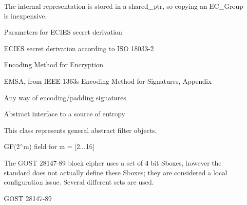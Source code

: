 The internal representation is stored in a shared\+\_\+ptr, so copying an E\+C\+\_\+\+Group is inexpensive.

Parameters for E\+C\+I\+ES secret derivation

E\+C\+I\+ES secret derivation according to I\+SO 18033-\/2

Encoding Method for Encryption

E\+M\+SA, from I\+E\+EE 1363s Encoding Method for Signatures, Appendix

Any way of encoding/padding signatures

Abstract interface to a source of entropy

This class represents general abstract filter objects.

G\+F(2$^\wedge$m) field for m = \mbox{[}2...16\mbox{]}

The G\+O\+ST 28147-\/89 block cipher uses a set of 4 bit Sboxes, however the standard does not actually define these Sboxes; they are considered a local configuration issue. Several different sets are used.

G\+O\+ST 28147-\/89

